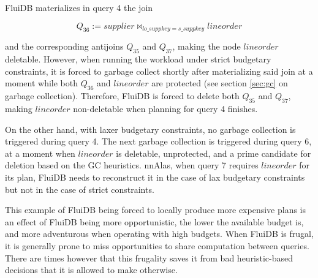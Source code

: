 FluiDB materializes in query 4 the join

\[
  Q_{36} := \mathit{supplier} \Join_{\mathit{lo\_suppkey} = \mathit{s\_suppkey}} \mathit{lineorder}
\]

and the corresponding antijoins \(Q_{35}\) and \(Q_{37}\), making the
node \(\mathit{lineorder}\) deletable. However, when running the
workload under strict budgetary constraints, it is forced to garbage
collect shortly after materializing said join at a moment while both
\(Q_{36}\) and \(\mathit{lineorder}\) are protected (see section
\ref{sec:gc} on garbage collection). Therefore, FluiDB is forced to
delete both \(Q_{35}\) and \(Q_{37}\), making \(\mathit{lineorder}\)
non-deletable when planning for query 4 finishes.

On the other hand, with laxer budgetary constraints, no garbage
collection is triggered during query 4. The next garbage collection is
triggered during query 6, at a moment when \(\mathit{lineorder}\) is
deletable, unprotected, and a prime candidate for deletion based on
the GC heuristics. nnAlas, when query 7 requires \(\mathit{lineorder}\)
for its plan, FluiDB needs to reconstruct it in the case of lax
budgetary constraints but not in the case of strict constraints.

This example of FluiDB being forced to locally produce more expensive
plans is an effect of FluiDB being more opportunistic, the lower the
available budget is, and more adventurous when operating with high
budgets. When FluiDB is frugal, it is generally prone to miss
opportunities to share computation between queries. There are times
however that this frugality saves it from bad heuristic-based
decisions that it is allowed to make otherwise.

